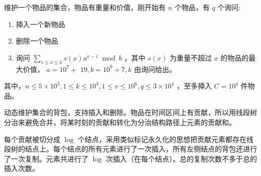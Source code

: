 \begin{tcolorbox}
\par \noindent 维护一个物品的集合，物品有重量和价值，刚开始有 $n$ 个物品，有 $q$ 个询问:
\begin{enumerate}
\item 揷入一个新物品

\item 删除一个物品

\item 询问 $\sum_{1 \leq x \leq k} s(x) a^{x-1} \bmod b$ ，其中 $s(x)$ 为重量不超过 $x$ 的物品的最大价值， $a=10^7+$ $19, b=10^9+7, k$ 由询问给出。
\end{enumerate}
\par \noindent 其中，$n \leq 5 \times 10^3, 1 \leq k \leq 10^3, 1 \leq v \leq 10^6, q \leq 3 \times 10^4$ ，至多揷入 $C=10^4$ 件物品。
\end{tcolorbox}
\par \noindent 动态维护集合的背包，支持插入和删除。物品在时间区间上有贡献，所以用线段树分治来避免合并，将某时刻的贡献和转化为分治结构路径上元素的贡献和。
~\\
\par \noindent 每个贡献被切分成 $\log$ 个结点，采用类似标记永久化的思想把贡献元素都存在线段树的结点上。每个结点的所有元素进行了一次插入，所有左侧结点的背包还进行了一次复制。元素共进行了 $\log$ 次插入（在每个结点）。总的复制次数不多于总的插入次数。
